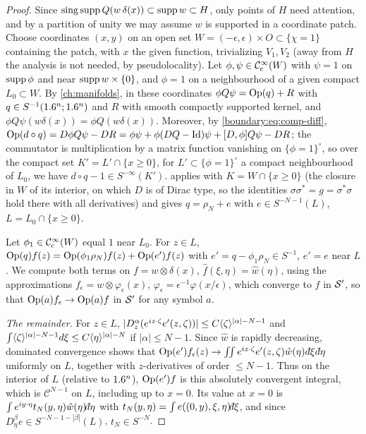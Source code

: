 \begin{proof}
Since $\operatorname{sing\,supp} Q(w\,\delta(x))\subset\operatorname{supp} w\subset H$, only points of $H$ need
attention, and by a partition of unity we may assume $w$ is supported in a coordinate
patch. Choose coordinates $(x,y)$ on an open set $W=(-\epsilon,\epsilon)\times O\subset
\{\chi=1\}$ containing the patch, with $x$ the given function, trivializing $V_1,V_2$
(away from $H$ the analysis is not needed, by pseudolocality). Let $\phi,\psi\in\mathcal{C}^\infty_{\mathrm{c}}(W)$ with $\psi=1$ on
$\operatorname{supp}\phi$ and near $\operatorname{supp} w\times\{0\}$, and $\phi=1$ on a neighbourhood of a given
compact $L_0\subset W$. By \cref{ch:manifolds}, in these coordinates $\phi Q\psi=
\operatorname{Op}(q)+R$ with $q\in S^{-1}(1.6^n;1.6^n)$ and $R$ with smooth compactly supported kernel,
and $\phi Q\psi(w\delta(x))=\phi Q(w\delta(x))$. Moreover, by
\eqref{boundary:eq:comp-diff}, $\operatorname{Op}(d\circ q)=D\phi Q\psi-DR=\phi\psi+\phi(DQ-\operatorname{Id})\psi
+[D,\phi]Q\psi-DR$; the commutator is multiplication by a matrix function vanishing
on $\{\phi=1\}^\circ$, so over the compact set $K'=L'\cap\{x\ge0\}$, for
$L'\subset\{\phi=1\}^\circ$ a compact neighbourhood of $L_0$, we have $d\circ q-1\in
S^{-\infty}(K')$.  applies with $K=W\cap\{x\ge0\}$ (the
closure in $W$ of its interior, on which $D$ is of Dirac type, so the identities
$\sigma\sigma^*=g=\sigma^*\sigma$ hold there with all derivatives) and gives
$q=\rho_N+e$ with $e\in S^{-N-1}(L)$, $L=L_0\cap\{x\ge0\}$.

Let $\phi_1\in\mathcal{C}^\infty_{\mathrm{c}}(W)$ equal $1$ near $L_0$. For $z\in L$, $\operatorname{Op}(q)f(z)=
\operatorname{Op}(\phi_1\rho_N)f(z)+\operatorname{Op}(e')f(z)$ with $e'=q-\phi_1\rho_N\in S^{-1}$, $e'=e$ near
$L$. We compute both terms on $f=w\otimes\delta(x)$, $\hat f(\xi,\eta)=\hat w(\eta)$,
using the approximations $f_\epsilon=w\otimes\varphi_\epsilon(x)$,
$\varphi_\epsilon=\epsilon^{-1}\varphi(x/\epsilon)$, which converge to $f$ in
$\mathcal{S}'$, so that $\operatorname{Op}(a)f_\epsilon\to\operatorname{Op}(a)f$ in $\mathcal{S}'$ for any symbol $a$.

\emph{The remainder.} For $z\in L$, $|D_z^\alpha(e^{iz\cdot\zeta}e'(z,\zeta))|\le
C\langle \zeta\rangle^{|\alpha|-N-1}$ and $\int\langle \zeta\rangle^{|\alpha|-N-1}d\xi\le C\langle \eta\rangle^{|\alpha|
-N}$ if $|\alpha|\le N-1$. Since $\hat w$ is rapidly decreasing, dominated convergence
shows that $\Op(e')f_\epsilon(z)\to\int\!\!\int e^{iz\cdot\zeta}e'(z,\zeta)\hat
w(\eta)\,\dbar\xi\,\dbar\eta$ uniformly on $L$, together with $z$-derivatives of order
$\le N-1$. Thus on the interior of $L$ (relative to $1.6^n$), $\operatorname{Op}(e')f$ is this
absolutely convergent integral, which is $\mathcal{C}^{N-1}$ on $L$, including up to
$x=0$. Its value at $x=0$ is $\int e^{iy\cdot\eta}t_N(y,\eta)\hat w(\eta)\dbar\eta$
with $t_N(y,\eta)=\int e((0,y),\xi,\eta)\dbar\xi$, and since $D^\beta_\eta e\in
S^{-N-1-|\beta|}(L)$, $t_N\in S^{-N}$.


\end{proof}
